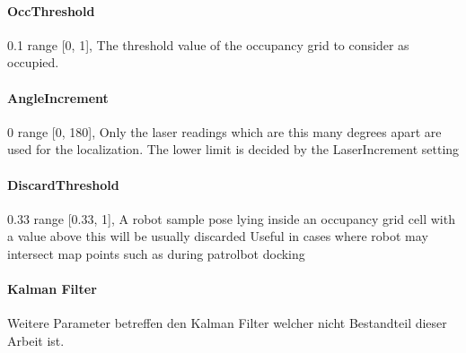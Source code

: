 \documentclass{article}
\begin{document}
\paragraph{OccThreshold} 0.1          range [0, 1],  The threshold value of the occupancy
                          grid to consider as occupied.

\paragraph{AngleIncrement} 0          range [0, 180],  Only the laser readings which are
                          this many degrees apart are used for the
                          localization. The lower limit is decided by the
                          LaserIncrement setting

\paragraph{DiscardThreshold} 0.33     range [0.33, 1],  A robot sample pose lying inside
                          an occupancy grid cell with a value above this will
                          be usually discarded Useful in cases where robot may
                          intersect map points such as during patrolbot
                          docking
\paragraph{Kalman Filter}
Weitere Parameter betreffen den Kalman Filter welcher nicht Bestandteil dieser Arbeit ist. 
\end{document}
